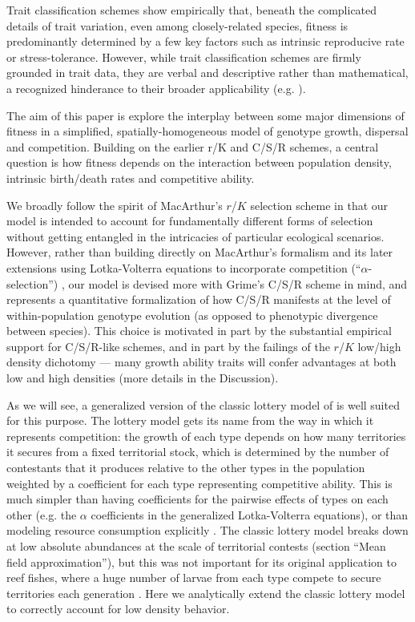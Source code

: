 \documentclass[11pt]{article}
\begin{document}
Trait classification schemes show empirically that, beneath the complicated details of trait variation, even among closely-related species, fitness is predominantly determined by a few key factors such as intrinsic reproducive rate or stress-tolerance. However, while trait classification schemes are firmly grounded in trait data, they are verbal and descriptive rather than mathematical, a recognized hinderance to their broader applicability (e.g. \citealt{tilman_2007}). 

The aim of this paper is explore the interplay between some major dimensions of fitness in a simplified, spatially-homogeneous model of genotype growth, dispersal and competition. Building on the earlier r/K and C/S/R schemes, a central question is how fitness depends on the interaction between population density, intrinsic birth/death rates and competitive ability. 

We broadly follow the spirit of MacArthur's $r$/$K$ selection scheme in that our model is intended to account for fundamentally different forms of selection without getting  entangled in the intricacies of particular ecological scenarios. However, rather than building directly on MacArthur's formalism and its later extensions using Lotka-Volterra equations to incorporate competition (``$\alpha$-selection'') \citep{gill_1974,case_1974,joshi_2001}, our model is devised more with Grime's C/S/R scheme in mind, and represents a quantitative formalization of how C/S/R manifests at the level of within-population genotype evolution (as opposed to phenotypic divergence between species). This choice is motivated in part by the substantial empirical support for C/S/R-like schemes, and in part by the failings of the $r$/$K$ low/high density dichotomy --- many growth ability traits will confer advantages at both low and high densities (more details in the Discussion). 

As we will see, a generalized version of the classic lottery model of \cite{chesson_1981} is well suited for this purpose. The lottery model gets its name from the way in which it represents competition: the growth of each type depends on how many territories it secures from a fixed territorial stock, which is determined by the number of contestants that it produces relative to the other types in the population weighted by a coefficient for each type representing competitive ability. This is much simpler than having coefficients for the pairwise effects of types on each other (e.g. the $\alpha$ coefficients in the generalized Lotka-Volterra equations), or than modeling resource consumption explicitly \citep{tilman_1982}. The classic lottery model  breaks down at low absolute abundances at the scale of territorial contests (section ``Mean field approximation''), but this was not important for its original application to reef fishes, where a huge number of larvae from each type compete to secure territories each generation \citep{chesson_1981}. Here we analytically extend the classic lottery model to correctly account for low density behavior. 
\end{document}

